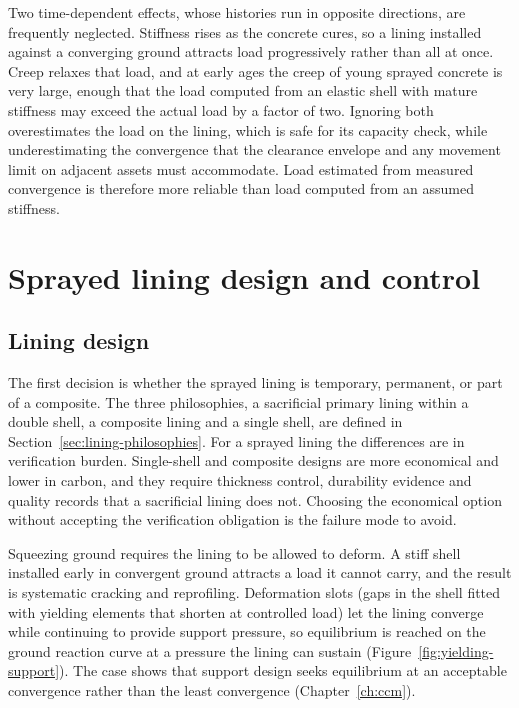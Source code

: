 Two time-dependent effects, whose histories run in opposite directions, are
frequently neglected. Stiffness rises as the concrete cures, so a lining installed
against a converging ground attracts load progressively rather than all at
once. Creep relaxes that load, and at early ages the creep of young sprayed concrete
is very large, enough that the load computed from an elastic shell with
mature stiffness may exceed the actual load by a factor of two. Ignoring both
overestimates the load on the lining, which is safe for its capacity check,
while underestimating the convergence that the clearance envelope and any
movement limit on adjacent assets must accommodate. Load
estimated from measured convergence is therefore more reliable than load
computed from an assumed stiffness.

\section{Sprayed lining design and control}
\label{sec:scl-design}

\subsection{Lining design}
\label{sec:scl-design-approach}

The first decision is whether the sprayed lining is temporary, permanent, or
part of a composite. The three philosophies, a sacrificial primary lining
within a double shell, a composite lining and a single shell, are defined in
Section~\ref{sec:lining-philosophies}. For a sprayed lining the differences
are in verification burden. Single-shell
and composite designs are more economical and lower in carbon, and they
require thickness control, durability evidence and quality records that a
sacrificial lining does not. Choosing the economical option without accepting
the verification obligation is the failure mode to avoid.

Squeezing ground requires the lining to be allowed to deform. A stiff shell
installed early in convergent ground attracts a load it cannot carry, and the
result is systematic cracking and reprofiling. Deformation slots (gaps in
the shell fitted with yielding elements that shorten at controlled load)
let the lining converge while continuing to provide support pressure, so
equilibrium is reached on the ground reaction curve at a pressure the lining
can sustain (Figure~\ref{fig:yielding-support}). The case shows that support design
seeks equilibrium at an acceptable convergence rather than the least
convergence (Chapter~\ref{ch:ccm}).

